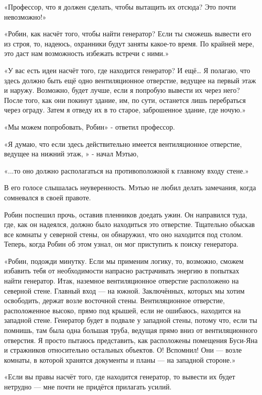 \documentclass[a4paper,12pt]{book}
\begin{document}
«Профессор, что я должен сделать, чтобы вытащить их отсюда? Это почти невозможно!»
\par
«Робин, как насчёт того, чтобы найти генератор? Если ты сможешь вывести его из строя, то, надеюсь, охранники будут заняты какое-то время. По крайней мере, это даст нам возможность избежать встречи с ними.»
\par
«У вас есть идеи насчёт того, где находится генератор? И ещё… Я полагаю, что здесь должно быть ещё одно вентиляционное отверстие, ведущее на первый этаж и наружу. Возможно, будет лучше, если я попробую вывести их через него? После того, как они покинут здание, им, по сути, останется лишь перебраться через ограду. Затем я отведу их в то старое, заброшенное здание, где ночую.»
\par
«Мы можем попробовать, Робин» - ответил профессор.
\par
«Я думаю, что если здесь действительно имеется вентиляционное отверстие, ведущее на нижний этаж, » - начал Мэтью,
\par
«...то оно должно располагаться на противоположной к главному входу стене.»
\par
В его голосе слышалась неуверенность. Мэтью не любил делать замечания, когда сомневался в своей правоте.
\par
Робин поспешил прочь, оставив пленников доедать ужин. Он направился туда, где, как он надеялся, должно было находиться это отверстие. Тщательно обыскав все комнаты у северной стены, он обнаружил, что оно находится под столом. Теперь, когда Робин об этом узнал, он мог приступить к поиску генератора.
\par
«Робин, подожди минутку. Если мы применим логику, то, возможно, сможем избавить тебя от необходимости напрасно растрачивать энергию в попытках найти генератор. Итак, наземное вентиляционное отверстие расположено на северной стене. Главный вход — на южной. Заключённых, которых мы хотим освободить, держат возле восточной стены. Вентиляционное отверстие, расположенное высоко, прямо под крышей, если не ошибаюсь, находится на западной стене. Генератор будет в подвале у западной стены, потому что, если ты помнишь, там была одна большая труба, ведущая прямо вниз от вентиляционного отверстия. Я просто пытаюсь представить, как расположены помещения Буси-Яна и стражников относительно остальных объектов. О! Вспомнил! Они — возле комнаты, в которой хранятся документы и планы — на западной стороне.»
\par
«Если вы правы насчёт того, где находится генератор, то вывести их будет нетрудно — мне почти не придётся прилагать усилий.\\
\end{document}
